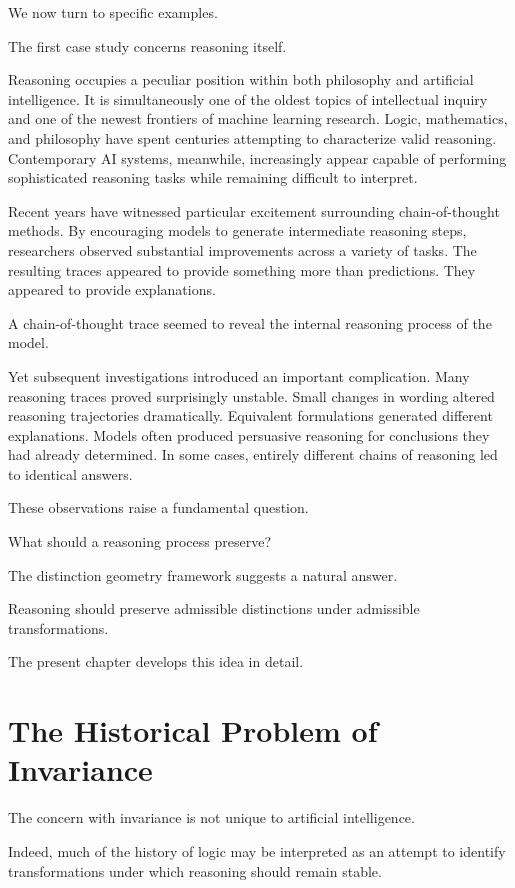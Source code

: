 \documentclass[11pt,oneside,openany]{book}
\begin{document}
We now turn to specific examples.

The first case study concerns reasoning itself.

Reasoning occupies a peculiar position within both philosophy and artificial intelligence. It is simultaneously one of the oldest topics of intellectual inquiry and one of the newest frontiers of machine learning research. Logic, mathematics, and philosophy have spent centuries attempting to characterize valid reasoning. Contemporary AI systems, meanwhile, increasingly appear capable of performing sophisticated reasoning tasks while remaining difficult to interpret.

Recent years have witnessed particular excitement surrounding chain-of-thought methods. By encouraging models to generate intermediate reasoning steps, researchers observed substantial improvements across a variety of tasks. The resulting traces appeared to provide something more than predictions. They appeared to provide explanations.

A chain-of-thought trace seemed to reveal the internal reasoning process of the model.

Yet subsequent investigations introduced an important complication. Many reasoning traces proved surprisingly unstable. Small changes in wording altered reasoning trajectories dramatically. Equivalent formulations generated different explanations. Models often produced persuasive reasoning for conclusions they had already determined. In some cases, entirely different chains of reasoning led to identical answers.

These observations raise a fundamental question.

What should a reasoning process preserve?

The distinction geometry framework suggests a natural answer.

Reasoning should preserve admissible distinctions under admissible transformations.

The present chapter develops this idea in detail.

\section{The Historical Problem of Invariance}

The concern with invariance is not unique to artificial intelligence.

Indeed, much of the history of logic may be interpreted as an attempt to identify transformations under which reasoning should remain stable.
\end{document}
